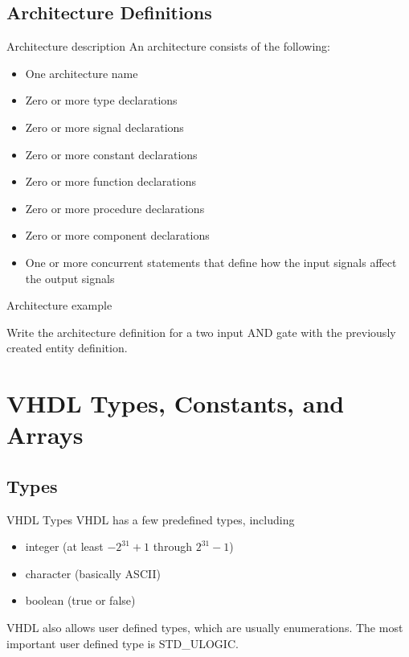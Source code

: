 \subsection{Architecture Definitions}

\begin{frame}{Architecture description}
  An architecture consists of the following:
  \begin{itemize}
    \item One architecture name
    \item Zero or more type declarations
    \item Zero or more signal declarations
    \item Zero or more constant declarations
    \item Zero or more function declarations
    \item Zero or more procedure declarations
    \item Zero or more component declarations
    \item One or more concurrent statements that define how the input signals affect the output signals
  \end{itemize}
\end{frame}

\begin{frame}{Architecture example}
  \begin{example}
    Write the architecture definition for a two input AND gate with the previously created entity definition.
  \end{example}
\end{frame}

\section{VHDL Types, Constants, and Arrays}
\subsection{Types}

\begin{frame}{VHDL Types}
  VHDL has a few predefined types, including
  \begin{itemize}
    \item integer (at least $-2^{31}+1$ through $2^{31}-1$)
    \item character (basically ASCII)
    \item boolean (true or false)
  \end{itemize}
  VHDL also allows user defined types, which are usually enumerations.  The most important user defined type is STD\_ULOGIC.
\end{frame}

